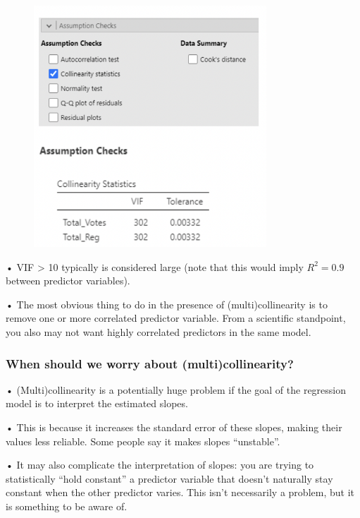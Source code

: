 \documentclass[
  letterpaper,
  DIV=11,
  numbers=noendperiod]{scrreprt}
\begin{document}
\begin{figure}

\includegraphics[width=3.4375in,height=\textheight]{images/mod4_pt1_30.png} \hfill{}

\end{figure}

• VIF \textgreater{} 10 typically is considered large (note that this
would imply \(R^2 = 0.9\) between predictor variables).

• The most obvious thing to do in the presence of (multi)collinearity is
to remove one or more correlated predictor variable. From a scientific
standpoint, you also may not want highly correlated predictors in the
same model.

\hypertarget{when-should-we-worry-about-multicollinearity}{%
\subsubsection{When should we worry about
(multi)collinearity?}\label{when-should-we-worry-about-multicollinearity}}

• (Multi)collinearity is a potentially huge problem if the goal of the
regression model is to interpret the estimated slopes.

• This is because it increases the standard error of these slopes,
making their values less reliable. Some people say it makes slopes
``unstable''.

• It may also complicate the interpretation of slopes: you are trying to
statistically ``hold constant'' a predictor variable that doesn't
naturally stay constant when the other predictor varies. This isn't
necessarily a problem, but it is something to be aware of.
\end{document}
